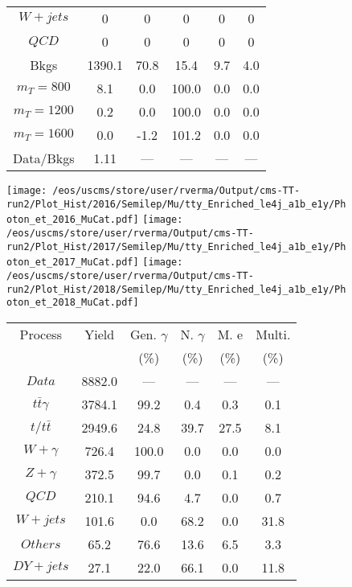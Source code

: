 \begin{figure}
\begin{minipage}[c]{0.32\textwidth}
{\begin{tabular}{cccccc}
$ W+jets $ &  0 &  0 &  0 &  0 &  0\\
$ QCD $ &  0 &  0 &  0 &  0 &  0\\
Bkgs &  1390.1 &  70.8 &  15.4 &  9.7 &  4.0\\
$ m_{T} = 800 $ &  8.1 &  0.0 &  100.0 &  0.0 &  0.0\\
$ m_{T} = 1200 $ &  0.2 &  0.0 &  100.0 &  0.0 &  0.0\\
$ m_{T} = 1600 $ &  0.0 &  -1.2 &  101.2 &  0.0 &  0.0\\
Data/Bkgs &  1.11 &  --- &  --- &  --- &  ---\\
\hline
\end{tabular}
}
\end{minipage}
\end{figure}

\begin{figure}
\centering
\texttt{[image: /eos/uscms/store/user/rverma/Output/cms-TT-run2/Plot\_Hist/2016/Semilep/Mu/tty\_Enriched\_le4j\_a1b\_e1y/Photon\_et\_2016\_MuCat.pdf]}
\texttt{[image: /eos/uscms/store/user/rverma/Output/cms-TT-run2/Plot\_Hist/2017/Semilep/Mu/tty\_Enriched\_le4j\_a1b\_e1y/Photon\_et\_2017\_MuCat.pdf]}
\texttt{[image: /eos/uscms/store/user/rverma/Output/cms-TT-run2/Plot\_Hist/2018/Semilep/Mu/tty\_Enriched\_le4j\_a1b\_e1y/Photon\_et\_2018\_MuCat.pdf]}
\begin{minipage}[c]{0.32\textwidth}
\centering
\tiny{
\begin{tabular}{cccccc}
\hline
Process & Yield & Gen. $\gamma$ & N. $\gamma$ & M. e & Multi. \\
 &  & (\%) & (\%) & (\%) & (\%)  \\
\hline
                                                                      $ Data $ &  8882.0 &  --- &  --- &  --- &  ---\\
$ t\bar{t}\gamma $ &  3784.1 &  99.2 &  0.4 &  0.3 &  0.1\\
$ t/t\bar{t} $ &  2949.6 &  24.8 &  39.7 &  27.5 &  8.1\\
$ W+\gamma $ &  726.4 &  100.0 &  0.0 &  0.0 &  0.0\\
$ Z+\gamma $ &  372.5 &  99.7 &  0.0 &  0.1 &  0.2\\
$ QCD $ &  210.1 &  94.6 &  4.7 &  0.0 &  0.7\\
$ W+jets $ &  101.6 &  0.0 &  68.2 &  0.0 &  31.8\\
$ Others $ &  65.2 &  76.6 &  13.6 &  6.5 &  3.3\\
$ DY+jets $ &  27.1 &  22.0 &  66.1 &  0.0 &  11.8\\

\end{tabular}}
\end{minipage}
\end{figure}

